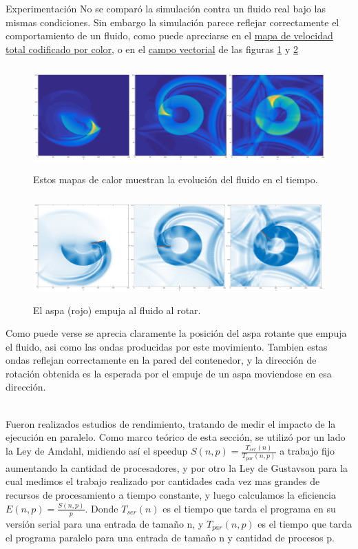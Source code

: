 
\begin{section}{Experimentación}
 No se comparó la simulación contra un fluido real bajo las mismas condiciones. Sin embargo la simulación parece reflejar correctamente el comportamiento de un fluido, como puede apreciarse en el \href{https://www.youtube.com/watch?v=D8JOELu8uAs}{mapa de velocidad total codificado por color}, o en el \href{https://www.youtube.com/watch?v=_JisfmOIEdU}{campo vectorial} de las figuras \ref{fig:sim_hm_all} y \ref{fig:sim_vf_all}
~\\
\begin{figure}
\includegraphics[width=\textwidth,height=4cm]{figures/sim_hm_all}
\caption{Estos mapas de calor muestran la evolución del fluido en el tiempo.}
\label{fig:sim_hm_all}
\end{figure}

\begin{figure}
\includegraphics[width=\textwidth,height=4cm]{figures/sim_vf_all}
\caption{El aspa (rojo) empuja al fluido al rotar.}
\label{fig:sim_vf_all}
\end{figure}

Como puede verse se aprecia claramente la posición del aspa rotante que empuja el fluido, asi como las ondas producidas por este movimiento. Tambien estas ondas reflejan correctamente en la pared del contenedor, y la dirección de rotación obtenida es la esperada por el empuje de un aspa moviendose en esa dirección.

~\\
Fueron realizados estudios de rendimiento, tratando de medir el impacto de la ejecución en paralelo. Como marco teórico de esta sección, se utilizó por un lado la Ley de Amdahl, midiendo así el speedup  $S(n,p) = \frac{T_{ser}(n) }{ T_{par}(n,p)}$  a trabajo fijo aumentando la cantidad de procesadores, y por otro la Ley de Gustavson para la cual medimos el trabajo realizado por cantidades cada vez mas grandes de recursos de procesamiento a tiempo constante, y luego calculamos la eficiencia $E(n,p) = \frac{S(n,p)}{p}$. Donde $ T_{ser}(n)$  es el tiempo que tarda el programa en su versión serial para una entrada de tamaño n, y $T_{par}(n,p)$  es el tiempo que tarda el programa paralelo para una entrada de tamaño n y cantidad de procesos p.


\end{section}
